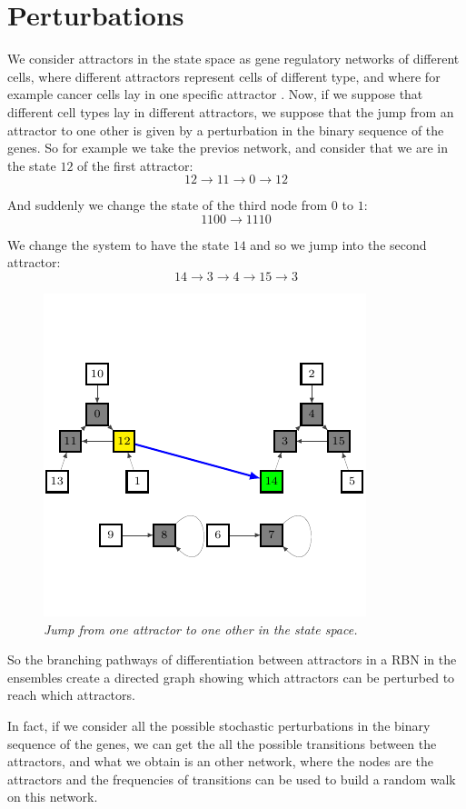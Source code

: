 \section{Perturbations}
We consider attractors in the state space as gene regulatory networks of different cells, where different attractors represent cells of different type, and where for example cancer cells lay in one specific attractor \cite{K3}\cite{K2}.
Now, if we suppose that different cell types lay in different attractors, we  suppose that the jump from an attractor to one other is given by a perturbation in the binary sequence of the genes.
So for example we take the previos network, and consider that we are in the state $12$ of the first attractor:
$$
12 \to 11 \to 0 \to 12
$$

And suddenly we change the state of the third node from $0$ to $1$:
$$
1100 \to 1110
$$

We change the system to have the state $14$ and so we jump into the second attractor:
$$
14 \to 3 \to 4 \to 15 \to 3
$$
\begin{figure}[h]
\centering
\includegraphics[scale=1.4]{fg4.pdf}
\caption{\emph{Jump from one attractor to one other in the state space.}}
\label{fig:rb4}
\end{figure}

So the branching pathways of differentiation between
attractors in a RBN in the ensembles create a directed
graph showing which attractors can be perturbed to
reach which attractors.

In fact, if we consider all the possible stochastic perturbations in the binary sequence of the genes, we can get the all the possible transitions between the attractors, and what we obtain is an other network, where the nodes are the attractors and the frequencies of transitions can be used to build a random walk on this network\cite{K2}.


